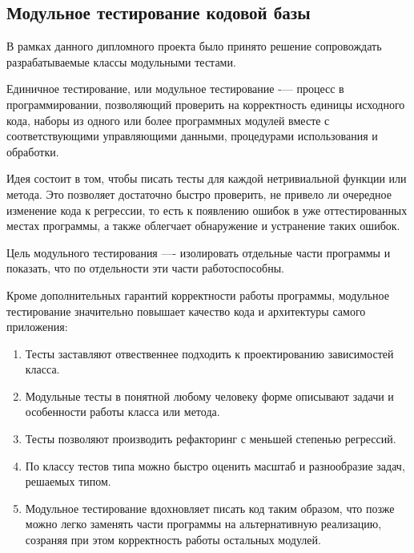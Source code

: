 \subsection{Модульное тестирование кодовой базы}
\label{sec:testing:unit}

В рамках данного дипломного проекта было принято решение сопровождать разрабатываемые классы модульными тестами.

Единичное тестирование, или модульное тестирование -— процесс в программировании, позволяющий проверить на корректность единицы исходного кода, наборы из одного или более программных модулей вместе с соответствующими управляющими данными, процедурами использования и обработки.

Идея состоит в том, чтобы писать тесты для каждой нетривиальной функции или метода. Это позволяет достаточно быстро проверить, не привело ли очередное изменение кода к регрессии, то есть к появлению ошибок в уже оттестированных местах программы, а также облегчает обнаружение и устранение таких ошибок. 

Цель модульного тестирования —- изолировать отдельные части программы и показать, что по отдельности эти части работоспособны. \cite{wiki:unit}

Кроме дополнительных гарантий корректности работы программы, модульное тестирование значительно повышает качество кода и архитектуры самого приложения:

\begin{enumerate}
	\item Тесты заставляют отвественнее подходить к проектированию зависимостей класса.
	\item Модульные тесты в понятной любому человеку форме описывают задачи и особенности работы класса или метода.
	\item Тесты позволяют производить рефакторинг с меньшей степенью регрессий.
	\item По классу тестов типа можно быстро оценить масштаб и разнообразие задач, решаемых типом.
	\item Модульное тестирование вдохновляет писать код таким образом, что позже можно легко заменять части программы на альтернативную реализацию, созраняя при этом корректность работы остальных модулей.
\end{enumerate}
